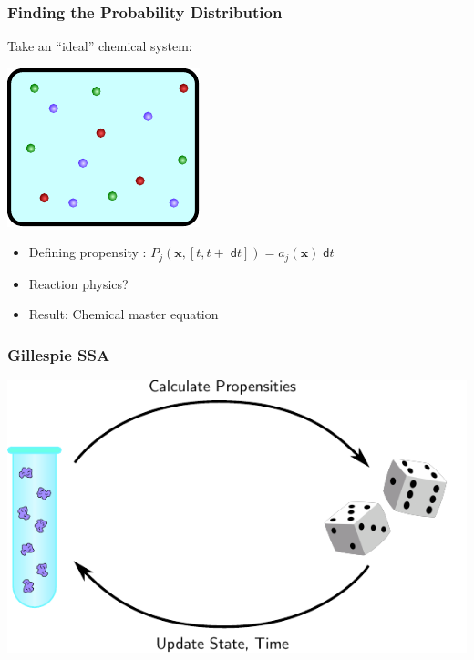 \documentclass[xcolor={usenames,dvipsnames,svgnames},url=hyphens]{beamer}
\newcommand{\dee}{\;\mathsf{d}}
\renewcommand{\vec}[1]{\ensuremath{\mathbf{#1}}}
\begin{document}
\begin{frame}
    \frametitle{Finding the Probability Distribution}
    Take an ``ideal'' chemical system:
    \begin{center}
        \includegraphics{figures/chem-sys-ideal.pdf}
    \end{center}
    \begin{itemize}
        \item Defining propensity \cite{gillespie-07}: $ P_j(\vec{x}, [t, t+\dee t]) = a_j(\vec{x})\dee t $
        \item Reaction physics?
        \item Result: Chemical master equation
    \end{itemize}
\end{frame}

\begin{frame}
    \frametitle{Gillespie SSA}
    \begin{center}
        \includegraphics{figures/ssa-illustration.pdf}
    \end{center}
\end{frame}
\end{document}
